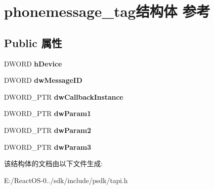 \hypertarget{structphonemessage__tag}{}\section{phonemessage\+\_\+tag结构体 参考}
\label{structphonemessage__tag}
\subsection*{Public 属性}
\begin{DoxyCompactItemize}
\item 
\mbox{\label{structphonemessage__tag_a1b4d7ef875ca70d9a7511e432b717837}} 
D\+W\+O\+RD {\bfseries h\+Device}
\item 
\mbox{\label{structphonemessage__tag_a44143fd6bc2281b4334fdd40f13c52ba}} 
D\+W\+O\+RD {\bfseries dw\+Message\+ID}
\item 
\mbox{\label{structphonemessage__tag_abfdb59f4a71399bbd4485ffdc0b0a3c1}} 
D\+W\+O\+R\+D\+\_\+\+P\+TR {\bfseries dw\+Callback\+Instance}
\item 
\mbox{\label{structphonemessage__tag_a12fd7f08a2c38c52e262fff5d9444020}} 
D\+W\+O\+R\+D\+\_\+\+P\+TR {\bfseries dw\+Param1}
\item 
\mbox{\label{structphonemessage__tag_aaae3dfd2adec860cbf1b554653f39d2a}} 
D\+W\+O\+R\+D\+\_\+\+P\+TR {\bfseries dw\+Param2}
\item 
\mbox{\label{structphonemessage__tag_a5bd9b9d8114c5af1d8470e843260ef70}} 
D\+W\+O\+R\+D\+\_\+\+P\+TR {\bfseries dw\+Param3}
\end{DoxyCompactItemize}


该结构体的文档由以下文件生成\+:\begin{DoxyCompactItemize}
\item 
E\+:/\+React\+O\+S-\/0../sdk/include/psdk/tapi.\+h\end{DoxyCompactItemize}

